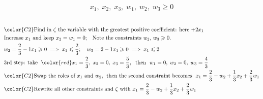 \documentclass[usenames,dvipsnames,8pt]{beamer}%
\begin{document}
\begin{frame}
\begin{columns}
\begin{column}{0.5\textwidth}
      \vspace{-0.4cm}
      \begin{align*}
        x_1,\;x_2,\;x_3,\;w_1,\;w_2,\;w_3\geqslant 0
      \end{align*}
    \end{column}
  \end{columns}
  \begin{align*}
    &{\color{C2}\text{Find in $\zeta$ the variable with the greatest positive coefficient: here $+2 x_1$}} \\
    &\text{Increase $x_1$ and keep $x_2 = w_1 = 0$;\quad Note the constraints $w_2,\,w_3\geqslant 0$.} \\
    &w_2 = \frac{2}{3}-1x_1\geqslant 0\;\Longrightarrow\; x_1\leqslant\frac{2}{3};\quad w_3 = 2-1x_1\geqslant 0\;\Longrightarrow\; x_1\leqslant 2\\
    &\text{3rd step: take }\;{\color{red}x_1 = \frac{2}{3},\; x_2 = 0,\; x_3 = \frac{5}{3}},\;\text{ then }\;w_1 = 0,\;w_2 = 0,\;w_3 = \frac{4}{3}\\
    &{\color{C2}\text{Swap the roles of $x_1$ and $w_2$,\;\text{ then the second constraint becomes }\;$x_1 = \frac{2}{3} -  w_2 + \frac{1}{3}x_2 + \frac{2}{3} w_1$}} \\
    &{\color{C2}\text{Rewrite all other constraints and $\zeta$ with $x_1 = \frac{2}{3} -  w_2 + \frac{1}{3}x_2 + \frac{2}{3} w_1$}} 
  \end{align*}
\end{frame}
\end{document}
